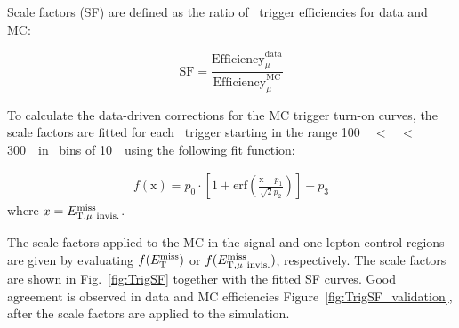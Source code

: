 \par Scale factors (SF) are defined as the ratio of \MET~trigger efficiencies for data and MC:

\begin{equation}
	\label{eq:dataMCsf}
	\text{SF} = \frac{\text{Efficiency}^{\text{data}}_{\mu}}{\text{Efficiency}^{\text{MC}}_{\mu}}
\end{equation}

To calculate the data-driven corrections for the MC trigger turn-on curves, the scale factors are fitted for each \MET~trigger starting in the range 100~\GeV~$<$ \METnomu~$<$ 300~\GeV~in \MET~bins of 10~\GeV~using the following fit function:

\begin{eqnarray}
	\label{eq:dataMCsf_fit}
	f\left(\text{x}\right) = p_0 \cdot \left[1 + \text{erf}\left(\frac{\text{x} - p_{1}}{\sqrt{2}p_{2}}\right)\right] + p_3
\end{eqnarray}
where $x = E_{\mathrm{T, \mu~invis.}}^{\mathrm{miss}}$.

\par The scale factors applied to the MC in the signal and one-lepton control regions are given by evaluating $f(E_{\mathrm{T}}^{\mathrm{miss}})$ or $f(E_{\mathrm{T, \mu~invis.}}^{\mathrm{miss}})$, respectively. 
The scale factors are shown in Fig.~\ref{fig:TrigSF} together with the fitted SF curves.
Good agreement is observed in data and MC efficiencies Figure~\ref{fig:TrigSF_validation}, after the scale factors are applied to the simulation.

